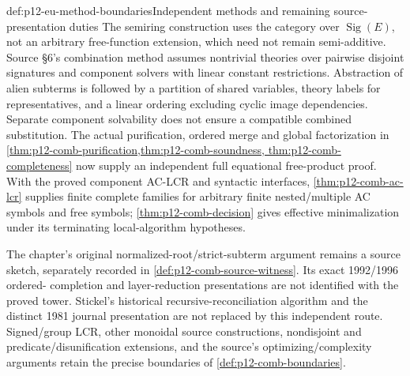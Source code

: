 \begin{proofboundary}{def:p12-eu-method-boundaries}{Independent methods and remaining source-presentation duties}
The semiring construction uses the category over \(\operatorname{Sig}(E)\),
not an arbitrary free-function extension, which need not remain
semi-additive. Source \S6's combination method assumes nontrivial theories
over pairwise disjoint signatures and component solvers with linear
constant restrictions. Abstraction of alien subterms is followed by a
partition of shared variables, theory labels for representatives, and
a linear ordering excluding cyclic image dependencies. Separate
component solvability does not ensure a compatible combined substitution.
The actual purification, ordered merge and global factorization in
\cref{thm:p12-comb-purification,thm:p12-comb-soundness,
thm:p12-comb-completeness} now supply an independent full equational
free-product proof. With the proved component AC-LCR and syntactic
interfaces, \cref{thm:p12-comb-ac-lcr} supplies finite complete
families for arbitrary finite nested/multiple AC symbols and free
symbols; \cref{thm:p12-comb-decision} gives effective minimalization
under its terminating local-algorithm hypotheses.

The chapter's original normalized-root/strict-subterm argument remains
a source sketch, separately recorded in
\cref{def:p12-comb-source-witness}. Its exact 1992/1996 ordered-
completion and layer-reduction presentations are not identified with
the proved tower. Stickel's historical recursive-reconciliation
algorithm and the distinct 1981 journal presentation are not replaced
by this independent route. Signed/group LCR, other monoidal source
constructions, nondisjoint and predicate/disunification extensions,
and the source's optimizing/complexity arguments retain the precise
boundaries of \cref{def:p12-comb-boundaries}.
\cite[\S6, pp.~513--519]{BaaderSnyder2001}


\end{proofboundary}
